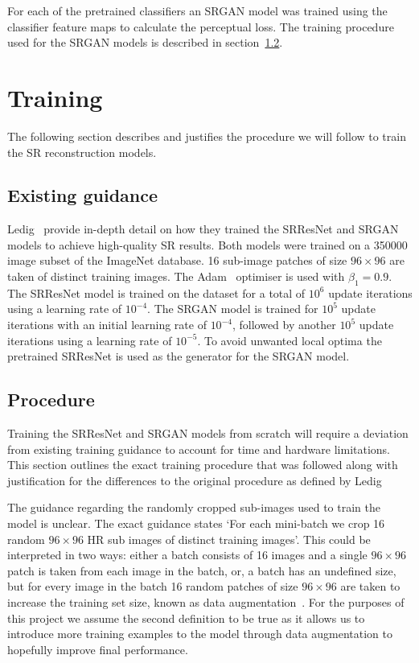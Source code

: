 For each of the pretrained classifiers an SRGAN model was trained using the classifier feature maps to calculate the perceptual loss. The training procedure used for the SRGAN models is described in section~\ref{subsec:procedure}.

\section{Training}
The following section describes and justifies the procedure we will follow to train the SR reconstruction models.

\subsection{Existing guidance}
Ledig \etal\ provide in-depth detail on how they trained the SRResNet and SRGAN models to achieve high-quality SR results. Both models were trained on a 350000 image subset of the ImageNet database. 16 sub-image patches of size $96 \times 96$ are taken of distinct training images. The Adam~\cite{adamOptimiser} optimiser is used with $\beta_1 = 0.9$. The SRResNet model is trained on the dataset for a total of $10^6$ update iterations using a learning rate of $10^{-4}$. The SRGAN model is trained for $10^5$ update iterations with an initial learning rate of $10^{-4}$, followed by another $10^5$ update iterations using a learning rate of $10^{-5}$. To avoid unwanted local optima the pretrained SRResNet is used as the generator for the SRGAN model.

\subsection{Procedure}\label{subsec:procedure}
Training the SRResNet and SRGAN models from scratch will require a deviation from existing training guidance to account for time and hardware limitations. This section outlines the exact training procedure that was followed along with justification for the differences to the original procedure as defined by Ledig \etal~\cite{srgan}

The guidance regarding the randomly cropped sub-images used to train the model is unclear. The exact guidance states `For each mini-batch we crop 16 random $96 \times 96$ HR sub images of distinct training images'. This could be interpreted in two ways: either a batch consists of 16 images and a single $96 \times 96$ patch is taken from each image in the batch, or, a batch has an undefined size, but for every image in the batch 16 random patches of size $96 \times 96$ are taken to increase the training set size, known as data augmentation~\cite{dataAugmentation}. For the purposes of this project we assume the second definition to be true as it allows us to introduce more training examples to the model through data augmentation to hopefully improve final performance.

